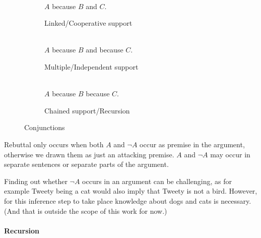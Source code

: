\documentclass{IOS-Book-Article}
\newcommand{\figsentence}[1]{\\{\sffamily{}#1}}
\begin{document}
\begin{figure}[ht!]
	\centering
	\begin{subfigure}[b]{0.3\textwidth}
		\centering
		\figsentence{$A$ because $B$ and $C$.}
		\caption{Linked/Cooperative support}
		\label{fig:cooperative}
	\end{subfigure}
	\begin{subfigure}[b]{0.3\textwidth}
		\centering
		\figsentence{$A$ because $B$ and because $C$.}
		\caption{Multiple/Independent support}
		\label{fig:independent}
	\end{subfigure}
	\begin{subfigure}[b]{.3\textwidth}
		\centering
		\figsentence{$A$ because $B$ because $C$.}
		\caption{Chained support/Recursion}
		\label{fig:chained}
	\end{subfigure}
	\caption{Conjunctions}
\end{figure}

Rebuttal only occurs when both $A$ and $\neg A$ occur as premise in the argument, otherwise we drawn them as just an attacking premise. $A$ and $\neg A$ may occur in separate sentences or separate parts of the argument.

Finding out whether $\neg A$ occurs in an argument can be challenging, as for example Tweety being a cat would also imply that Tweety is not a bird. However, for this inference step to take place knowledge about dogs and cats is necessary. (And that is outside the scope of this work for now.)

\paragraph{Recursion}
\end{document}
